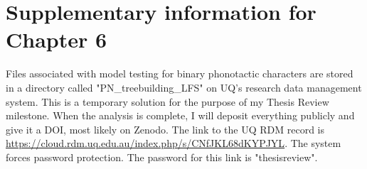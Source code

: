 \chapter{Supplementary information for Chapter 6}

Files associated with model testing for binary phonotactic characters are stored in a directory called "PN\_treebuilding\_LFS" on UQ's research data management system. This is a temporary solution for the purpose of my Thesis Review milestone. When the analysis is complete, I will deposit everything publicly and give it a DOI, most likely on Zenodo. The link to the UQ RDM record is  \href{https://cloud.rdm.uq.edu.au/index.php/s/CNfJKL68dKYPJYL}{https://cloud.rdm.uq.edu.au/index.php/s/CNfJKL68dKYPJYL}. The system forces password protection. The password for this link is "thesisreview".

